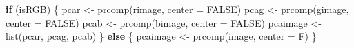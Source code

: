 \documentclass[
]{article}
\newenvironment{Shaded}{\begin{snugshade}}{\end{snugshade}}
\newcommand{\AttributeTok}[1]{\textcolor[rgb]{0.77,0.63,0.00}{#1}}
\newcommand{\ConstantTok}[1]{\textcolor[rgb]{0.00,0.00,0.00}{#1}}
\newcommand{\ControlFlowTok}[1]{\textcolor[rgb]{0.13,0.29,0.53}{\textbf{#1}}}
\newcommand{\FunctionTok}[1]{\textcolor[rgb]{0.00,0.00,0.00}{#1}}
\newcommand{\NormalTok}[1]{#1}
\newcommand{\OtherTok}[1]{\textcolor[rgb]{0.56,0.35,0.01}{#1}}
\begin{document}
\begin{Shaded}
\begin{Highlighting}[]
\ControlFlowTok{if}\NormalTok{ (isRGB) \{}
\NormalTok{    pcar }\OtherTok{\textless{}{-}} \FunctionTok{prcomp}\NormalTok{(rimage, }\AttributeTok{center =} \ConstantTok{FALSE}\NormalTok{)}
\NormalTok{    pcag }\OtherTok{\textless{}{-}} \FunctionTok{prcomp}\NormalTok{(gimage, }\AttributeTok{center =} \ConstantTok{FALSE}\NormalTok{)}
\NormalTok{    pcab }\OtherTok{\textless{}{-}} \FunctionTok{prcomp}\NormalTok{(bimage, }\AttributeTok{center =} \ConstantTok{FALSE}\NormalTok{)}
\NormalTok{    pcaimage }\OtherTok{\textless{}{-}} \FunctionTok{list}\NormalTok{(pcar, pcag, pcab)}
\NormalTok{\} }\ControlFlowTok{else}\NormalTok{ \{}
\NormalTok{    pcaimage }\OtherTok{\textless{}{-}} \FunctionTok{prcomp}\NormalTok{(image, }\AttributeTok{center =}\NormalTok{ F)}
\NormalTok{\}}
\end{Highlighting}
\end{Shaded}
\end{document}
